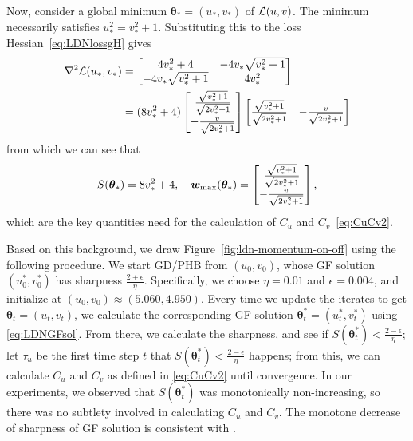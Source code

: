 Now, consider a global minimum $\bm\theta_* = (u_*, v_*)$ of ${\mathcal{L}}(u,v)$. The minimum necessarily satisfies $u_*^2 = v_*^2 + 1$. Substituting this to the loss Hessian~\eqref{eq:LDNlossgH} gives
\begin{align*}
    \nabla^2 {\mathcal{L}}(u_*,v_*) 
    &= 
    \begin{bmatrix}
        4v_*^2 + 4 & -4v_* \sqrt{v_*^2+1} \\
        -4v_* \sqrt{v_*^2+1} & 4v_*^2
    \end{bmatrix}\\
    &=
    (8v_*^2 + 4)
    \begin{bmatrix}
        \frac{\sqrt{v_*^2+1}}{\sqrt{2v_*^2+1}}\\
        -\frac{v}{\sqrt{2v_*^2+1}}
    \end{bmatrix}
    \begin{bmatrix}
        \frac{\sqrt{v_*^2+1}}{\sqrt{2v_*^2+1}} &
        -\frac{v}{\sqrt{2v_*^2+1}}
    \end{bmatrix}
\end{align*}
from which we can see that
\begin{equation*}
S(\bm\theta_*) = 8v_*^2 + 4,\quad
{\bm{w}}_{\max} (\bm\theta_*) = \begin{bmatrix}
        \frac{\sqrt{v_*^2+1}}{\sqrt{2v_*^2+1}}\\
        -\frac{v}{\sqrt{2v_*^2+1}}
    \end{bmatrix},
\end{equation*}
which are the key quantities need for the calculation of $C_u$ and $C_v$~\eqref{eq:CuCv2}.

Based on this background, we draw Figure~\ref{fig:ldn-momentum-on-off} using the following procedure. We start GD/PHB from $(u_0,v_0)$, whose GF solution $(u_0^*,v_0^*)$ has sharpness $\frac{2+\epsilon}{\eta}$. Specifically, we choose $\eta = 0.01$ and $\epsilon = 0.004$, and initialize at $(u_0,v_0) \approx (5.060, 4.950)$. Every time we update the iterates to get $\bm\theta_t = (u_t,v_t)$, we calculate the corresponding GF solution $\bm\theta_t^* = (u_t^*,v_t^*)$ using \eqref{eq:LDNGFsol}. From there, we calculate the sharpness, and see if $S(\bm\theta_t^*) < \frac{2-\epsilon}{\eta}$; let $\tau_u$ be the first time step $t$ that $S(\bm\theta_t^*) < \frac{2-\epsilon}{\eta}$ happens; from this, we can calculate $C_u$ and $C_v$ as defined in \eqref{eq:CuCv2} until convergence. In our experiments, we observed that $S(\bm\theta_t^*)$ was monotonically non-increasing, so there was no subtlety involved in calculating $C_u$ and $C_v$. The monotone decrease of sharpness of GF solution is consistent with \citet{kreisler2023gradient}. 

